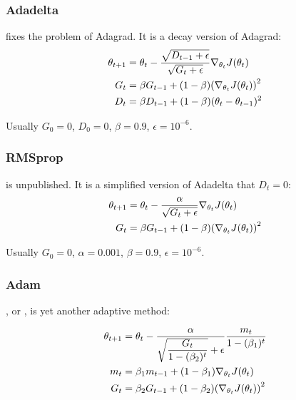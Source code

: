 \subsubsection{Adadelta}
\cite{Zeiler2012} fixes the problem of Adagrad. It is a decay version of Adagrad:
\begin{equation}
    \begin{aligned}
        \theta_{t+1} &= \theta_t - \frac{\sqrt{D_{t-1} + \epsilon}}{\sqrt{G_t + \epsilon}}  \nabla_{\theta_t} J(\theta_t) \\
        G_t &= \beta G_{t-1} + (1-\beta) \mleft(\nabla_{\theta_t} J(\theta_t) \mright)^2 \\
        D_t &= \beta D_{t-1} + (1-\beta) (\theta_t - \theta_{t-1})^2
    \end{aligned}
\end{equation}

Usually $G_0 = 0$, $D_0 = 0$, $\beta = 0.9$, $\epsilon = 10^{-6}$.

\subsubsection{RMSprop}

 is unpublished. It is a simplified version of Adadelta that $D_t = 0$:
\begin{equation}
    \begin{aligned}
        \theta_{t+1} &= \theta_t - \frac{\alpha}{\sqrt{G_t + \epsilon}}  \nabla_{\theta_t} J(\theta_t) \\
        G_t &= \beta G_{t-1} + (1-\beta) \mleft(\nabla_{\theta_t} J(\theta_t) \mright)^2 \\
    \end{aligned}
\end{equation}

Usually $G_0 = 0$, $\alpha = 0.001$, $\beta = 0.9$, $\epsilon = 10^{-6}$.




\subsubsection{Adam}

\cite{Kingma2015}, or , is yet another adaptive method:

\begin{equation}
    \begin{aligned}
        \theta_{t+1} &= \theta_t - \frac{\alpha}{\sqrt{\displaystyle \frac{G_t}{1-(\beta_2)^t}} + \epsilon} \frac{m_t}{1-(\beta_1)^t}  \\
        m_t &= \beta_1 m_{t-1} + (1-\beta_1) \nabla_{\theta_t} J(\theta_t) \\
        G_t &= \beta_2 G_{t-1} + (1-\beta_2) \mleft(\nabla_{\theta_t} J(\theta_t) \mright)^2
    \end{aligned}
\end{equation}

